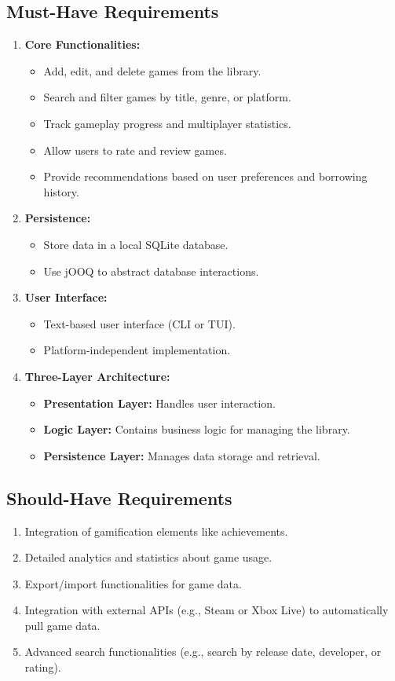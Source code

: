 \documentclass[paper=a4,fontsize=12pt,parskip=half*]{scrartcl}
\begin{document}
\subsection{Must-Have Requirements}
\begin{enumerate}
	\item \textbf{Core Functionalities:}
	      \begin{itemize}
		      \item Add, edit, and delete games from the library.
		      \item Search and filter games by title, genre, or platform.
		      \item Track gameplay progress and multiplayer statistics.
		      \item Allow users to rate and review games.
		      \item Provide recommendations based on user preferences and borrowing history.
	      \end{itemize}
	\item \textbf{Persistence:}
	      \begin{itemize}
		      \item Store data in a local SQLite database.
		      \item Use jOOQ to abstract database interactions.
	      \end{itemize}
	\item \textbf{User Interface:}
	      \begin{itemize}
		      \item Text-based user interface (CLI or TUI).
		      \item Platform-independent implementation.
	      \end{itemize}
	\item \textbf{Three-Layer Architecture:}
	      \begin{itemize}
		      \item \textbf{Presentation Layer:} Handles user interaction.
		      \item \textbf{Logic Layer:} Contains business logic for managing the library.
		      \item \textbf{Persistence Layer:} Manages data storage and retrieval.
	      \end{itemize}
\end{enumerate}

\subsection{Should-Have Requirements}
\begin{enumerate}
	\item Integration of gamification elements like achievements.
	\item Detailed analytics and statistics about game usage.
	\item Export/import functionalities for game data.
	\item Integration with external APIs (e.g., Steam or Xbox Live) to automatically pull game data.
	\item Advanced search functionalities (e.g., search by release date, developer, or rating).
\end{enumerate}
\end{document}
